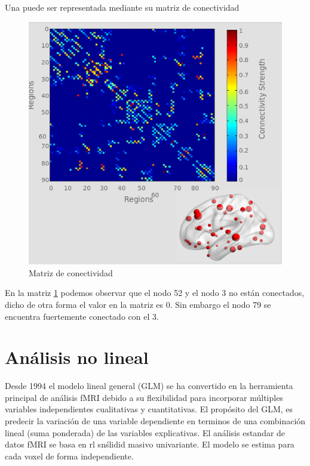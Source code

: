 Una puede ser representada mediante su matriz de conectividad

	\begin{figure}[H]
  		\centering
    	\includegraphics[scale=0.5]{img/matrix_conect.png}
  		\caption{Matriz de conectividad}         \label{preproc:matrix_conect}
	\end{figure}
	
En la matriz \ref{preproc:matrix_conect} podemos observar que el nodo 52 y el nodo 3 no están conectados, dicho de otra forma el valor en la matriz es 0. Sin embargo el nodo 79 se encuentra fuertemente conectado con el 3.

\section{Análisis no lineal}

 Desde 1994 el modelo lineal general (GLM) se ha convertido en la herramienta principal de análisis fMRI debido a su flexibilidad para incorporar múltiples variables independientes cualitativas y cuantitativas. El propósito del GLM, es predecir la variación de una variable dependiente en terminos de una combinación lineal (suma ponderada) de las variables explicativas. El análisis estandar de datos fMRI se basa en rl snślidid masivo univariante. El modelo se estima para cada voxel de forma independiente.
 
